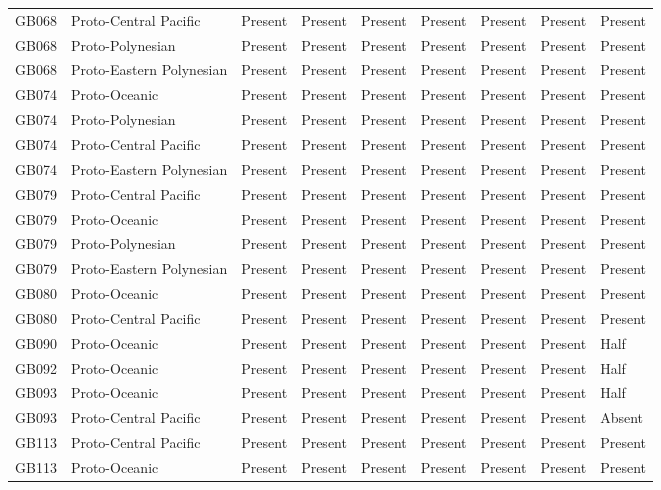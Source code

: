 \begin{longtable}{p{1.5cm}p{2.5cm}p{2.5cm}p{2.5cm}p{2.5cm}p{2.5cm}p{2.5cm}p{2.5cm}p{2.5cm}}
  GB068 & Proto-Central Pacific & Present & Present & Present & Present & Present & Present & Present \\ 
  GB068 & Proto-Polynesian & Present & Present & Present & Present & Present & Present & Present \\ 
  GB068 & Proto-Eastern Polynesian & Present & Present & Present & Present & Present & Present & Present \\ 
  GB074 & Proto-Oceanic & Present & Present & Present & Present & Present & Present & Present \\ 
  GB074 & Proto-Polynesian & Present & Present & Present & Present & Present & Present & Present \\ 
  GB074 & Proto-Central Pacific & Present & Present & Present & Present & Present & Present & Present \\ 
  GB074 & Proto-Eastern Polynesian & Present & Present & Present & Present & Present & Present & Present \\ 
  GB079 & Proto-Central Pacific & Present & Present & Present & Present & Present & Present & Present \\ 
  GB079 & Proto-Oceanic & Present & Present & Present & Present & Present & Present & Present \\ 
  GB079 & Proto-Polynesian & Present & Present & Present & Present & Present & Present & Present \\ 
  GB079 & Proto-Eastern Polynesian & Present & Present & Present & Present & Present & Present & Present \\ 
  GB080 & Proto-Oceanic & Present & Present & Present & Present & Present & Present & Present \\ 
  GB080 & Proto-Central Pacific & Present & Present & Present & Present & Present & Present & Present \\ 
  GB090 & Proto-Oceanic & Present & Present & Present & Present & Present & Present & Half \\ 
  GB092 & Proto-Oceanic & Present & Present & Present & Present & Present & Present & Half \\ 
  GB093 & Proto-Oceanic & Present & Present & Present & Present & Present & Present & Half \\ 
  GB093 & Proto-Central Pacific & Present & Present & Present & Present & Present & Present & Absent \\ 
  GB113 & Proto-Central Pacific & Present & Present & Present & Present & Present & Present & Present \\ 
  GB113 & Proto-Oceanic & Present & Present & Present & Present & Present & Present & Present \\ 

\end{longtable}
